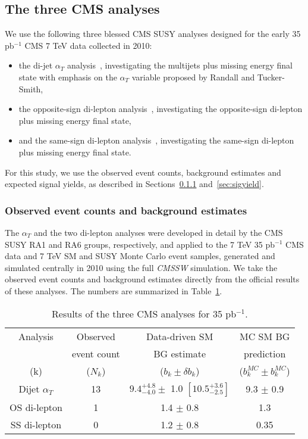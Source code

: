 \subsection{The three CMS analyses}

We use the following three blessed CMS SUSY analyses designed for the early 35 pb$^{-1}$ CMS 7 TeV data  collected in 2010:
\begin{itemize}
\item the di-jet $\alpha_T$ analysis~\cite{alphatpaper}, investigating the multijets plus missing energy final state with emphasis on the $\alpha_T$ variable proposed by Randall and Tucker-Smith,
\item the opposite-sign di-lepton analysis~\cite{ospaper}, investigating the opposite-sign di-lepton plus missing energy final state,
\item and the same-sign di-lepton analysis~\cite{sspaper}, investigating the same-sign di-lepton plus missing energy final state.
\end{itemize}
For this study, we use the observed event counts, background estimates and expected signal yields, as described in Sections~\ref{sec:dbgcount} and~\ref{sec:sigyield}.

\subsubsection{Observed event counts and background estimates}
\label{sec:dbgcount}

The $\alpha_T$ and the two di-lepton analyses were developed in detail by the CMS SUSY RA1 and RA6 groups, respectively, and applied to the 7 TeV 35 pb$^{-1}$ CMS data and 7 TeV SM and SUSY Monte Carlo event samples, 
generated and simulated centrally in 2010
using the full {\it CMSSW} simulation.
We take the observed event counts and background estimates directly from the official results of these analyses.  The numbers are summarized in Table~\ref{tab:dbgcount}.

\begin{table}[htdp]
\caption{Results of the three CMS analyses for 35 pb$^{-1}$.}
\begin{center}
\begin{tabular}{|c|c|c|c|}
\hline
Analysis & Observed    & Data-driven SM & MC SM BG \\
              & event count & BG estimate      & prediction    \\
(k)          & ($N_k$)     & ($b_k \pm \delta b_k$) & ($b_k^{MC} \pm b_k^{MC}$) \\
\hline              
Dijet $\alpha_T$ & 13 & $9.4^{+ 4.8}_{-4.0} \pm $ 1.0 $[ 10.5^{+3.6}_{-2.5} ]$ & 9.3 $\pm$ 0.9 \\
OS di-lepton & 1 & 1.4 $\pm$ 0.8 & 1.3 \\
SS di-lepton & 0 & 1.2 $\pm$ 0.8 & 0.35 \\
\hline
\end{tabular}
\end{center}
\label{tab:dbgcount}
\end{table}%


